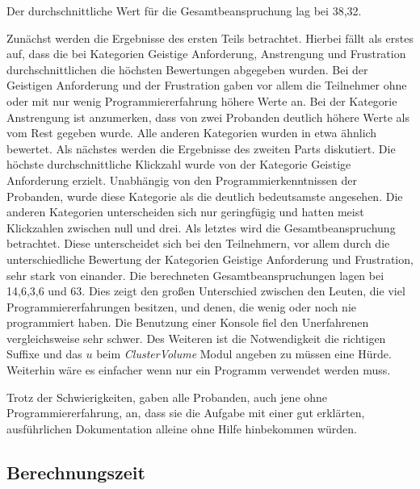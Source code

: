 Der durchschnittliche Wert für die Gesamtbeanspruchung lag bei 38,32. 


Zunächst werden die Ergebnisse des ersten Teils betrachtet. Hierbei fällt als erstes auf, dass die bei Kategorien Geistige Anforderung, Anstrengung und Frustration durchschnittlichen die höchsten Bewertungen abgegeben wurden. Bei der Geistigen Anforderung und der Frustration gaben vor allem die Teilnehmer ohne oder mit nur wenig Programmiererfahrung höhere Werte an. Bei der Kategorie Anstrengung ist anzumerken, dass von zwei Probanden deutlich höhere Werte als vom Rest gegeben wurde. Alle anderen Kategorien wurden in etwa ähnlich bewertet.
\newline
Als nächstes werden die Ergebnisse des zweiten Parts diskutiert. Die höchste durchschnittliche Klickzahl wurde von der Kategorie Geistige Anforderung erzielt. Unabhängig von den Programmierkenntnissen der Probanden, wurde diese Kategorie als die deutlich bedeutsamste angesehen. Die anderen Kategorien unterscheiden sich nur geringfügig und hatten meist Klickzahlen zwischen null und drei.
\newline
Als letztes wird die Gesamtbeanspruchung betrachtet. Diese unterscheidet sich bei den Teilnehmern, vor allem durch die unterschiedliche Bewertung der Kategorien Geistige Anforderung und Frustration, sehr stark von einander. Die berechneten Gesamtbeanspruchungen lagen bei 14,6,3,6 und 63. Dies zeigt den großen Unterschied zwischen den Leuten, die viel Programmiererfahrungen besitzen, und denen, die wenig oder noch nie programmiert haben.
\newline
Die Benutzung einer Konsole fiel den Unerfahrenen vergleichsweise sehr schwer. Des Weiteren ist die Notwendigkeit die richtigen Suffixe und das $u$ beim \textit{ClusterVolume} Modul angeben zu müssen eine Hürde. Weiterhin wäre es einfacher wenn nur ein Programm verwendet werden muss.

 
Trotz der Schwierigkeiten, gaben alle Probanden, auch jene ohne Programmiererfahrung, an, dass sie die Aufgabe mit einer gut erklärten, ausführlichen Dokumentation alleine ohne Hilfe hinbekommen würden.

\subsection{Berechnungszeit}

